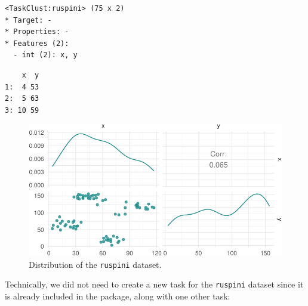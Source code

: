 \begin{verbatim}
<TaskClust:ruspini> (75 x 2)
* Target: -
* Properties: -
* Features (2):
  - int (2): x, y
\end{verbatim}

\begin{Shaded}
\begin{Highlighting}[]
\SpecialCharTok{$}\NormalTok{(}\SpecialCharTok{:}\NormalTok{) }
\end{Highlighting}
\end{Shaded}

\begin{verbatim}
    x  y
1:  4 53
2:  5 63
3: 10 59
\end{verbatim}

\begin{Shaded}
\begin{Highlighting}[]
\end{Highlighting}
\end{Shaded}

\begin{figure}[H]

{\centering \includegraphics[width=1\textwidth,height=\textheight]{chapters/chapter13/beyond_regression_and_classification_files/figure-pdf/fig-beyond-clust-ruspini-1.pdf}

}

\caption{\label{fig-beyond-clust-ruspini}Distribution of the
\texttt{ruspini} dataset.}

\end{figure}

Technically, we did not need to create a new task for the
\texttt{ruspini} dataset since it is already included in the package,
along with one other task:

